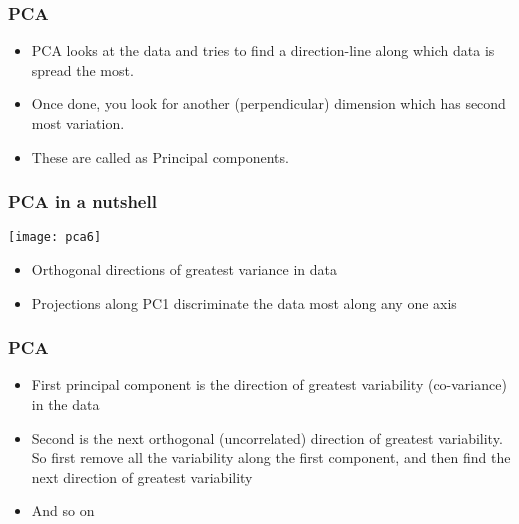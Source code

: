 \begin{frame}[fragile] \frametitle{PCA} 
\begin{itemize}
\item PCA looks at the data and tries to find a direction-line along which data is spread the most.
\item Once done, you look for another (perpendicular) dimension which has second most variation.
\item These are called as Principal components.
\end{itemize}
\end{frame}
%

\begin{frame}[fragile] \frametitle{PCA in a nutshell} 
\begin{center}
\texttt{[image: pca6]}
\end{center}
\begin{itemize}
\item Orthogonal directions of greatest variance in data
\item Projections along PC1 discriminate the data most along any one axis
\end{itemize}
\end{frame}

\begin{frame}[fragile] \frametitle{PCA} 
\begin{itemize}
\item  First principal component is the direction of greatest
variability (co-variance) in the data
\item Second is the next orthogonal (uncorrelated) direction of greatest variability. So first remove all the variability along the first
component, and then find the next direction of greatest variability 
\item  And so on
\end{itemize}
\end{frame}

